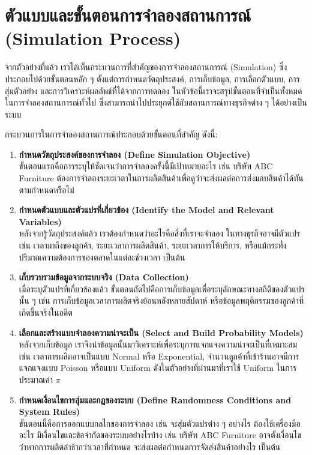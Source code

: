 \newpage
\section{ตัวแบบและขั้นตอนการจำลองสถานการณ์ (Simulation Process)}

จากตัวอย่างที่แล้ว เราได้เห็นกระบวนการที่สำคัญของการจำลองสถานการณ์ (Simulation) ซึ่งประกอบไปด้วยขั้นตอนหลัก ๆ ตั้งแต่การกำหนดวัตถุประสงค์, การเก็บข้อมูล, การเลือกตัวแบบ, การสุ่มตัวอย่าง และการวิเคราะห์ผลลัพธ์ที่ได้จากการทดลอง ในหัวข้อนี้เราจะสรุปขั้นตอนที่จำเป็นทั้งหมดในการจำลองสถานการณ์ทั่วไป ซึ่งสามารถนำไปประยุกต์ใช้กับสถานการณ์ทางธุรกิจต่าง ๆ ได้อย่างเป็นระบบ

กระบวนการในการจำลองสถานการณ์ประกอบด้วยขั้นตอนที่สำคัญ ดังนี้:

\begin{enumerate}
    \item \textbf{กำหนดวัตถุประสงค์ของการจำลอง (Define Simulation Objective)}\\
    ขั้นตอนแรกคือการระบุให้ชัดเจนว่าการจำลองครั้งนี้มีเป้าหมายอะไร เช่น บริษัท ABC Furniture ต้องการจำลองระยะเวลาในการผลิตสินค้าเพื่อดูว่าจะส่งผลต่อการส่งมอบสินค้าได้ทันตามกำหนดหรือไม่
    
    \item \textbf{กำหนดตัวแบบและตัวแปรที่เกี่ยวข้อง (Identify the Model and Relevant Variables)}\\
    หลังจากรู้วัตถุประสงค์แล้ว เราต้องกำหนดว่าอะไรคือสิ่งที่เราจะจำลอง ในทางธุรกิจอาจมีตัวแปรเช่น เวลามาถึงของลูกค้า, ระยะเวลาการผลิตสินค้า, ระยะเวลาการให้บริการ, หรือแม้กระทั่งปริมาณความต้องการของตลาดในแต่ละช่วงเวลา เป็นต้น
    
    \item \textbf{เก็บรวบรวมข้อมูลจากระบบจริง (Data Collection)}\\
    เมื่อระบุตัวแปรที่เกี่ยวข้องแล้ว ขั้นตอนถัดไปคือการเก็บข้อมูลเพื่อระบุลักษณะทางสถิติของตัวแปรนั้น ๆ เช่น การเก็บข้อมูลเวลาการผลิตจริงย้อนหลังหลายสัปดาห์ หรือข้อมูลพฤติกรรมของลูกค้าที่เกิดขึ้นจริงในอดีต
    
    \item \textbf{เลือกและสร้างแบบจำลองความน่าจะเป็น (Select and Build Probability Models)}\\
    หลังจากเก็บข้อมูล เราจึงนำข้อมูลนั้นมาวิเคราะห์เพื่อระบุการแจกแจงความน่าจะเป็นที่เหมาะสม เช่น เวลาการผลิตอาจเป็นแบบ Normal หรือ Exponential, จำนวนลูกค้าที่เข้าร้านอาจมีการแจกแจงแบบ Poisson หรือแบบ Uniform ดังในตัวอย่างที่ผ่านมาที่เราใช้ Uniform ในการประมาณค่า $\pi$
    
    \item \textbf{กำหนดเงื่อนไขการสุ่มและกฎของระบบ (Define Randomness Conditions and System Rules)}\\
    ขั้นตอนนี้คือการออกแบบกลไกของการจำลอง เช่น จะสุ่มตัวแปรต่าง ๆ อย่างไร ต้องใช้เครื่องมืออะไร มีเงื่อนไขและข้อจำกัดของระบบอย่างไรบ้าง เช่น บริษัท ABC Furniture อาจตั้งเงื่อนไขว่าหากการผลิตล่าช้ากว่าเวลาที่กำหนด จะส่งผลต่อกำหนดการจัดส่งสินค้าอย่างไร เป็นต้น
    

\end{enumerate}
